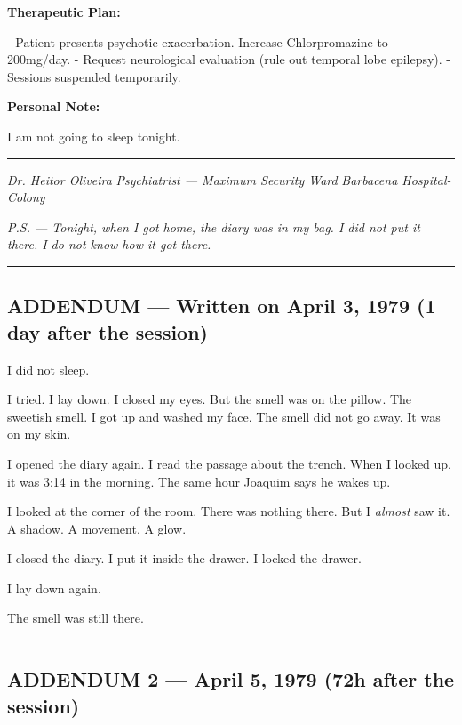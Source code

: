 \noindent \textbf{Therapeutic Plan:}

\noindent - Patient presents psychotic exacerbation. Increase Chlorpromazine to 200mg/day.
- Request neurological evaluation (rule out temporal lobe epilepsy).
- Sessions suspended temporarily.

\noindent \textbf{Personal Note:}

\noindent I am not going to sleep tonight.

\vspace{0.5em}\noindent\rule{\textwidth}{0.5pt}\vspace{0.5em}

\noindent \textit{Dr. Heitor Oliveira}
\textit{Psychiatrist --- Maximum Security Ward}
\textit{Barbacena Hospital-Colony}

\noindent \textit{P.S. --- Tonight, when I got home, the diary was in my bag. I did not put it there. I do not know how it got there.}

\vspace{0.5em}\noindent\rule{\textwidth}{0.5pt}\vspace{0.5em}

\subsection*{ADDENDUM --- Written on April 3, 1979 (1 day after the session)}

\noindent I did not sleep.

\noindent I tried. I lay down. I closed my eyes. But the smell was on the pillow. The sweetish smell. I got up and washed my face. The smell did not go away. It was on my skin.

\noindent I opened the diary again. I read the passage about the trench. When I looked up, it was 3:14 in the morning. The same hour Joaquim says he wakes up.

\noindent I looked at the corner of the room. There was nothing there. But I \textit{almost} saw it. A shadow. A movement. A glow.

\noindent I closed the diary. I put it inside the drawer. I locked the drawer.

\noindent I lay down again.

\noindent The smell was still there.

\vspace{0.5em}\noindent\rule{\textwidth}{0.5pt}\vspace{0.5em}

\subsection*{ADDENDUM 2 --- April 5, 1979 (72h after the session)}

